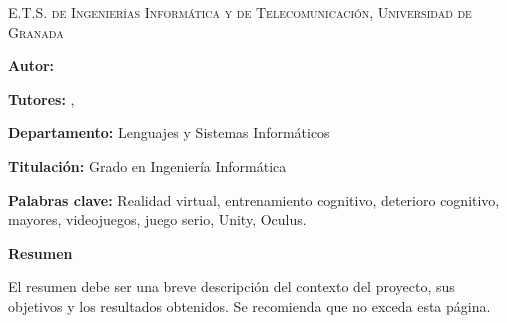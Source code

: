 
\pagestyle{fancy}
\renewcommand{\headrulewidth}{0pt}

\begin{center}
	\scshape
	E.T.S. de Ingenierías Informática y de Telecomunicación, Universidad de Granada
\end{center}

\bigskip

\begin{center}
	\Large \scshape
	\textbf{\tfgtitlename}
\end{center}

\bigskip \bigskip \bigskip

\begin{minipage}{\textwidth}

\textbf{Autor:} \tfgauthorname

\medskip

\textbf{Tutores:} \tfgtutornameA , \tfgtutornameB

\medskip


\medskip

\textbf{Departamento:} Lenguajes y Sistemas Informáticos

\medskip

\textbf{Titulación:} Grado en Ingeniería Informática

\medskip

\textbf{Palabras clave:} Realidad virtual, entrenamiento cognitivo, deterioro cognitivo, mayores, videojuegos, juego serio, Unity, Oculus.

\bigskip \bigskip


\end{minipage}

\begin{center}
	\textbf{Resumen}
\end{center}



El resumen debe ser una breve descripción del contexto del proyecto,
sus objetivos y los resultados obtenidos. Se recomienda que no exceda
esta página.


\blankpage
